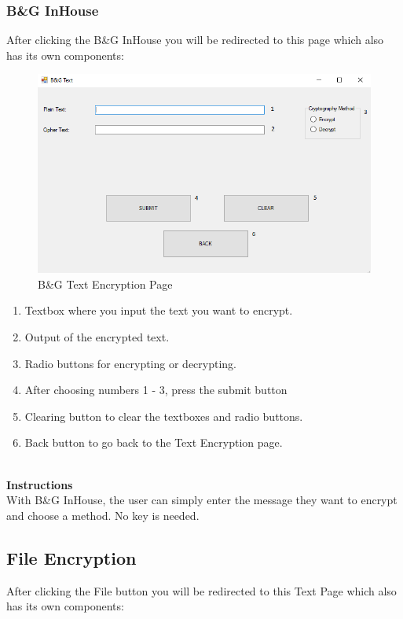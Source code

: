 \subsubsection{B\&G InHouse}

After clicking the B\&G InHouse you will be redirected to this page which also has its own components:
\begin{figure}[h!]
\centering
\includegraphics[scale=0.5]{Diagrams/custom.png}
\caption{B\&G Text Encryption Page}
\label{fig:figure1}
\end{figure}

\begin{enumerate}
   \item Textbox where you input the text you want to encrypt.
   \item Output of the encrypted text.
   \item Radio buttons for encrypting or decrypting.
   \item After choosing numbers 1 - 3, press the submit button
   \item Clearing button to clear the textboxes and radio buttons.
   \item Back button to go back to the Text Encryption page.

\end{enumerate}

\textbf{\\Instructions\\}
With B\&G InHouse, the user can simply enter the message they want to encrypt and choose a method. No key is needed.

\subsection{File Encryption}
After clicking the File button you will be redirected to this Text Page which also has its own components:

